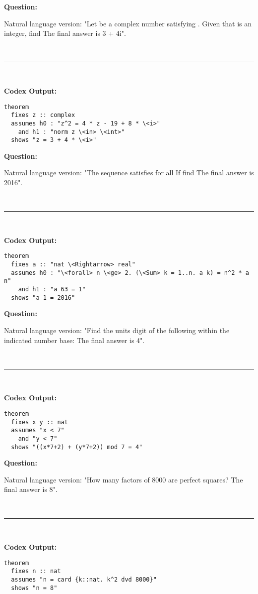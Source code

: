 \documentclass{article}
\begin{document}
\begin{boxB}
\textbf{Question:}

Natural language version: "Let  be a complex number satisfying 
. Given that  is an integer, find  The final answer is 3 + 4i".

\
\hrule
\

\textbf{Codex Output:}
\begin{lstlisting}
theorem
  fixes z :: complex
  assumes h0 : "z^2 = 4 * z - 19 + 8 * \<i>"
    and h1 : "norm z \<in> \<int>"
  shows "z = 3 + 4 * \<i>" 
\end{lstlisting}
\end{boxB}



\begin{boxB}
\textbf{Question:}

Natural language version: "The sequence  satisfies
for all 
  If  find  The final answer is 2016".

\
\hrule
\

\textbf{Codex Output:}
\begin{lstlisting}
theorem
  fixes a :: "nat \<Rightarrow> real"
  assumes h0 : "\<forall> n \<ge> 2. (\<Sum> k = 1..n. a k) = n^2 * a n"
    and h1 : "a 63 = 1"
  shows "a 1 = 2016"    
\end{lstlisting}
\end{boxB}



\begin{boxB}
\textbf{Question:}

Natural language version: "Find the units digit of the following 
within the indicated number base:  The final answer is 4".

\
\hrule
\

\textbf{Codex Output:}
\begin{lstlisting}
theorem
  fixes x y :: nat
  assumes "x < 7"
    and "y < 7"
  shows "((x*7+2) + (y*7+2)) mod 7 = 4"
\end{lstlisting}
\end{boxB}



\begin{boxB}
\textbf{Question:}

Natural language version: "How many factors of 8000 are perfect squares? The final answer is 8".

\
\hrule
\

\textbf{Codex Output:}
\begin{lstlisting}
theorem
  fixes n :: nat
  assumes "n = card {k::nat. k^2 dvd 8000}"
  shows "n = 8"   
\end{lstlisting}
\end{boxB}
\end{document}
